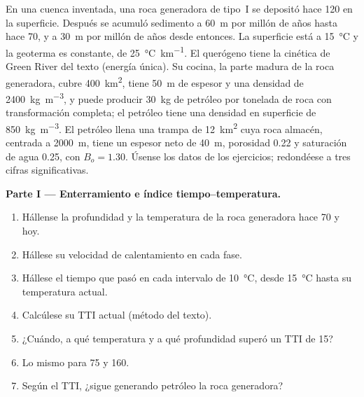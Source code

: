 \begin{problem}\label{pb:b2:energy-geology:1}
En una cuenca inventada, una roca generadora de tipo~I se depositó hace \qty{120}{\Ma} en la superficie.
Después se acumuló sedimento a \qty{60}{m} por millón de años hasta hace \qty{70}{\Ma}, y a \qty{30}{m}
por millón de años desde entonces. La superficie está a \qty{15}{\celsius} y la geoterma es constante, de
\qty{25}{\celsius\per\km}. El querógeno tiene la cinética de Green River del texto (energía única).
Su cocina, la parte madura de la roca generadora, cubre \qty{400}{km^2}, tiene \qty{50}{m} de espesor y
una densidad de \qty{2400}{kg.m^{-3}}, y puede producir \qty{30}{kg} de petróleo por tonelada de roca con transformación
completa; el petróleo tiene una densidad en superficie de \qty{850}{kg.m^{-3}}. El petróleo llena una trampa de
\qty{12}{km^2} cuya roca almacén, centrada a \qty{2000}{m}, tiene un espesor neto de \qty{40}{m},
porosidad 0.22 y saturación de agua 0.25, con $B_o = 1.30$. Úsense los datos de los ejercicios; redondéese a
tres cifras significativas.

\noindent\textbf{Parte I --- Enterramiento e índice tiempo--temperatura.}
\begin{enumerate}
  \item Hállense la profundidad y la temperatura de la roca generadora hace \qty{70}{\Ma} y hoy.
  \item Hállese su velocidad de calentamiento en cada fase.
  \item Hállese el tiempo que pasó en cada intervalo de \qty{10}{\celsius}, desde \qty{15}{\celsius} hasta
        su temperatura actual.
  \item Calcúlese su TTI actual (método del texto).
  \item ¿Cuándo, a qué temperatura y a qué profundidad superó un TTI de 15?
  \item Lo mismo para 75 y 160.
  \item Según el TTI, ¿sigue generando petróleo la roca generadora?
\end{enumerate}


\end{problem}
